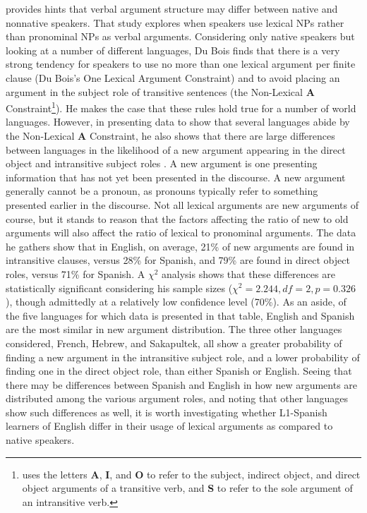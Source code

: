 \documentclass[main.tex]{subfiles}
\begin{document}
\citet{dubois:2003} provides hints that verbal argument structure may differ between native and nonnative speakers. That study explores when speakers use lexical NPs rather than pronominal NPs as verbal arguments. Considering only native speakers but looking at a number of different languages, Du Bois finds that there is a very strong tendency for speakers to use no more than one lexical argument per finite clause (Du Bois's One Lexical Argument Constraint) and to avoid placing an argument in the subject role of transitive sentences (the Non-Lexical \textbf{A} Constraint\footnote{\citet{dubois:2003} uses the letters \textbf{A}, \textbf{I}, and \textbf{O} to refer to the subject, indirect object, and direct object arguments of a transitive verb, and \textbf{S} to refer to the sole argument of an intransitive verb.}). He makes the case that these rules hold true for a number of world languages. However, in presenting data to show that several languages abide by the Non-Lexical \textbf{A} Constraint, he also shows that there are large differences between languages in the likelihood of a new argument appearing in the direct object and intransitive subject roles \citep[Table~2.5]{dubois:2003}. A new argument is one presenting information that has not yet been presented in the discourse. A new argument generally cannot be a pronoun, as pronouns typically refer to something presented earlier in the discourse. Not all lexical arguments are new arguments of course, but it stands to reason that the factors affecting the ratio of new to old arguments will also affect the ratio of lexical to pronominal arguments. The data he gathers show that in English, on average, 21\% of new arguments are found in intransitive clauses, versus 28\% for Spanish, and 79\% are found in direct object roles, versus 71\% for Spanish. A $\chi^2$ analysis shows that these differences are statistically significant considering his sample sizes ($\chi^2=2.244, df=2, p=0.326$), though admittedly at a relatively low confidence level (70\%). As an aside, of the five languages for which data is presented in that table, English and Spanish are the most similar in new argument distribution. The three other languages considered, French, Hebrew, and Sakapultek, all show a greater probability of finding a new argument in the intransitive subject role, and a lower probability of finding one in the direct object role, than either Spanish or English. Seeing that there may be differences between Spanish and English in how new arguments are distributed among the various argument roles, and noting that other languages show such differences as well, it is worth investigating whether L1-Spanish learners of English differ in their usage of lexical arguments as compared to native speakers.
\end{document}
